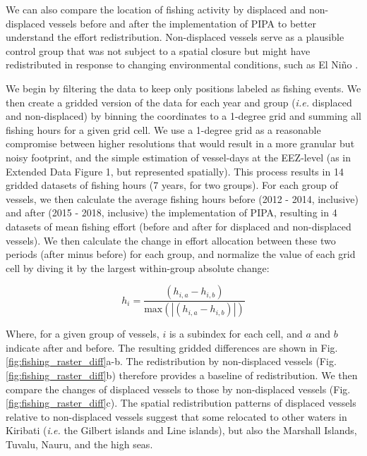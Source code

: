 \documentclass[12pt]{article}
\begin{document}
We can also compare the location of fishing activity by displaced and non-displaced vessels before and after the implementation of PIPA to better understand the effort redistribution. Non-displaced vessels serve as a plausible control group that was not subject to a spatial closure but might have redistributed in response to changing environmental conditions, such as El Ni\~no \cite{hanich2018unraveling,aqorau_2018}.

We begin by filtering the data to keep only positions labeled as fishing events. We then create a gridded version of the data for each year and group (\emph{i.e.} displaced and non-displaced) by binning the coordinates to a 1-degree grid and summing all fishing hours for a given grid cell. We use a 1-degree grid as a reasonable compromise between higher resolutions that would result in a more granular but noisy footprint, and the simple estimation of vessel-days at the EEZ-level (as in Extended Data Figure 1, but represented spatially). This process results in 14 gridded datasets of fishing hours (7 years, for two groups). For each group of vessels, we then calculate the average fishing hours before (2012 - 2014, inclusive) and after (2015 - 2018, inclusive) the implementation of PIPA, resulting in 4 datasets of mean fishing effort (before and after for displaced and non-displaced vessels). We then calculate the change in effort allocation between these two periods (after minus before) for each group, and normalize the value of each grid cell by diving it by the largest within-group absolute change:

\begin{equation}
h_i = \frac{(h_{i, a} - h_{i, b})}{\mathrm{max}(|(h_{i, a} - h_{i, b})|)}
\end{equation}

Where, for a given group of vessels, $i$ is a subindex for each cell, and $a$ and $b$ indicate after and before. The resulting gridded differences are shown in Fig. \ref{fig:fishing_raster_diff}a-b. The redistribution by non-displaced vessels (Fig. \ref{fig:fishing_raster_diff}b) therefore provides a baseline of redistribution. We then compare the changes of displaced vessels to those by non-displaced vessels (Fig. \ref{fig:fishing_raster_diff}c). The spatial redistribution patterns of displaced vessels relative to non-displaced vessels suggest that some relocated to other waters in Kiribati (\emph{i.e.} the Gilbert islands and Line islands), but also the Marshall Islands, Tuvalu, Nauru, and the high seas.
\end{document}

